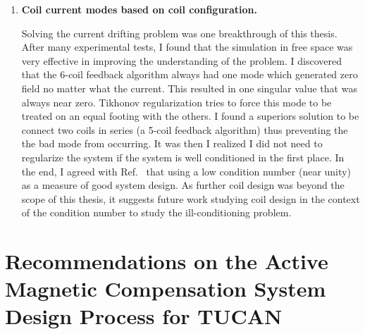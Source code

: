 \begin{enumerate}
\item {\bf Coil current modes based on coil configuration.}  

Solving the current drifting problem was one breakthrough of this thesis. After many experimental tests, I found that the simulation in free space was very effective in improving the understanding of the problem. I discovered that the 6-coil feedback algorithm always had one mode which generated zero field no matter what the current. This resulted in one singular value that was always near zero. Tikhonov regularization tries to force this mode to be treated on an equal footing with the others. I found a superiors solution to be connect two coils in series (a 5-coil feedback algorithm) thus preventing the the bad mode from occurring. It was then I realized I did not need to regularize the system if the system is well conditioned in the first place. In the end, I agreed with Ref.~\cite{rawlik} that using a low condition number (near unity) as a measure of good system design. As further coil design was beyond the scope of this thesis, it suggests future work studying coil design in the context of the condition number to study the ill-conditioning problem.

\end{enumerate}



\section{Recommendations on the Active Magnetic Compensation System Design Process for TUCAN}

